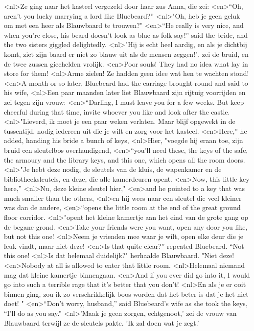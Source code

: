 <nl>Ze ging naar het kasteel vergezeld door haar zus Anna, die zei:
<en>“Oh, aren’t you lucky marrying a lord like Bluebeard?”
<nl>"Oh, heb je geen geluk om met een heer als Blauwbaard te trouwen?"
<en>“He really is very nice, and when you’re close, his beard doesn’t look as blue as folk say!” said the bride, and the two sisters giggled delightedly.
<nl>"Hij is echt heel aardig, en als je dichtbij komt, ziet zijn baard er niet zo blauw uit als de mensen zeggen!", zei de bruid, en de twee zussen giechelden vrolijk. 
<en>Poor souls! They had no idea what lay in store for them!
<nl>Arme zielen! Ze hadden geen idee wat hen te wachten stond!
<en>A month or so later, Bluebeard had the carriage brought round and said to his wife,
<nl>Een paar maanden later liet Blauwbaard zijn rijtuig voorrijden en zei tegen zijn vrouw: 
<en>“Darling, I must leave you for a few weeks. But keep cheerful during that time, invite whoever you like and look after the castle.
<nl>"Lieverd, ik moet je een paar weken verlaten. Maar blijf opgewekt in de tussentijd, nodig iedereen uit die je wilt en zorg voor het kasteel.
<en>Here,” he added, handing his bride a bunch of keys, 
<nl>Hier, "voegde hij eraan toe, zijn bruid een sleutelbos overhandigend, 
<en>“you’ll need these, the keys of the safe, the armoury and the library keys, and this one, which opens all the room doors.
<nl>"Je hebt deze nodig, de sleutels van de kluis, de wapenkamer en de bibliotheeksleutels, en deze, die alle kamerdeuren opent.
<en>Now, this little key here,” 
<nl>Nu, deze kleine sleutel hier," 
<en>and he pointed to a key that was much smaller than the others, 
<nl>en hij wees naar een sleutel die veel kleiner was dan de andere,
<en>“opens the little room at the end of the great ground floor corridor.
<nl>"opent het kleine kamertje aan het eind van de grote gang op de begane grond.
<en>Take your friends were you want, open any door you like, but not this one!
<nl>Neem je vrienden mee waar je wilt, open elke deur die je leuk vindt, maar niet deze!
<en>Is that quite clear?” repeated Bluebeard. “Not this one!
<nl>Is dat helemaal duidelijk?" herhaalde Blauwbaard. "Niet deze!
<en>Nobody at all is allowed to enter that little room.
<nl>Helemaal niemand mag dat kleine kamertje binnengaan.
<en>And if you ever did go into it, I would go into such a terrible rage that it’s better that you don’t!
<nl>En als je er ooit binnen ging, zou ik zo verschrikkelijk boos worden dat het beter is dat je het niet doet! "
<en>“Don’t worry, husband,” said Bluebeard’s wife as she took the keys,  “I’ll do as you say.” 
<nl>'Maak je geen zorgen, echtgenoot,' zei de vrouw van Blauwbaard terwijl ze de sleutels pakte. 'Ik zal doen wat je zegt.' 
